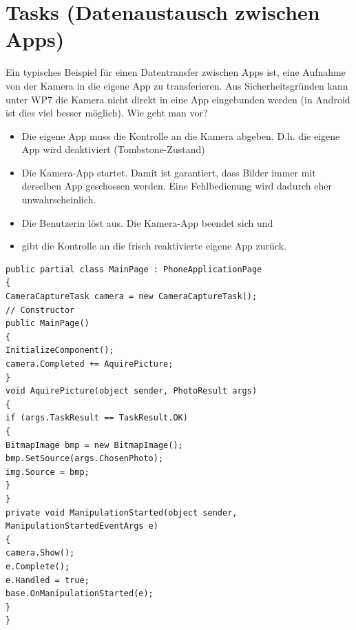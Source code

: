 \documentclass[a4paper,10pt]{scrreprt}
\begin{document}
\chapter{Tasks (Datenaustausch zwischen Apps)}
Ein typisches Beispiel für einen Datentransfer zwischen Apps ist, eine Aufnahme von der Kamera in die eigene
App zu transferieren. Aus Sicherheitsgründen kann unter WP7 die Kamera nicht direkt in eine App eingebunden
werden (in Android ist dies viel besser möglich). Wie geht man vor?
\begin{itemize}
\item Die eigene App muss die Kontrolle an die Kamera abgeben. D.h. die eigene App wird deaktiviert
(Tombstone-Zustand)
\item Die Kamera-App startet. Damit ist garantiert, dass Bilder immer mit derselben App geschossen werden.
Eine Fehlbedienung wird dadurch eher unwahrscheinlich.
\item Die Benutzerin löst aus. Die Kamera-App beendet sich und
\item gibt die Kontrolle an die frisch reaktivierte eigene App zurück.
\end{itemize}
\begin{lstlisting}[caption=Kamera Beispiel]
 public partial class MainPage : PhoneApplicationPage
{
CameraCaptureTask camera = new CameraCaptureTask();
// Constructor
public MainPage()
{
InitializeComponent();
camera.Completed += AquirePicture;
}
void AquirePicture(object sender, PhotoResult args)
{
if (args.TaskResult == TaskResult.OK)
{
BitmapImage bmp = new BitmapImage();
bmp.SetSource(args.ChosenPhoto);
img.Source = bmp;
}
}
private void ManipulationStarted(object sender, ManipulationStartedEventArgs e)
{
camera.Show();
e.Complete();
e.Handled = true;
base.OnManipulationStarted(e);
}
}
\end{lstlisting}
\end{document}
